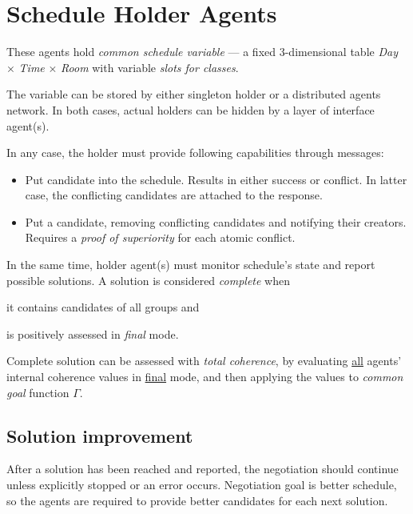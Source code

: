 \documentclass[../../header]{subfiles}
\begin{document}
\providecommand{\rootdir}{../..}


\section{Schedule Holder Agents}
\label{sec:solution-schedule-var}

These agents hold \emph{common schedule variable} --- a fixed 3-dimensional table
\emph{Day} $\times$ \emph{Time} $\times$ \emph{Room} with variable
\emph{slots for classes}.

The variable can be stored by either singleton holder or a distributed agents network.
In both cases, actual holders can be hidden by a layer of interface agent(s).

In any case, the holder must provide following capabilities through messages:
\begin{itemize}
  \item Put candidate into the schedule. Results in either success or conflict.
        In latter case, the conflicting candidates are attached to the response.
  \item Put a candidate, removing conflicting candidates and notifying their
        creators. Requires a \emph{proof of superiority} for each atomic conflict.
\end{itemize}

\medskip
\noindent
In the same time, holder agent(s) must monitor schedule's state and report
possible solutions. A solution is considered \emph{complete} when
\begin{enumerate*}[1)]
  \item it contains candidates of all groups and
  \item is positively assessed in \emph{final} mode.
\end{enumerate*}

Complete solution can be assessed with \emph{total coherence}, by
evaluating \underline{all} agents' internal coherence values in \underline{final}
mode, and then applying the values to \emph{common goal} function $\Gamma$.

\subsection{Solution improvement}
\label{sec:solution-better}

After a solution has been reached and reported, the negotiation should continue
unless explicitly stopped or an error occurs. Negotiation goal is better
schedule, so the agents are required to provide better candidates for each next
solution.
\end{document}

